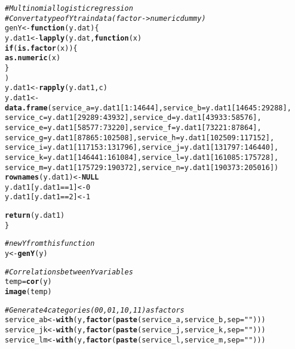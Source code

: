 \documentclass{article}\usepackage[]{graphicx}\usepackage[]{color}
\makeatletter
\newcommand{\hlnum}[1]{\textcolor[rgb]{0.686,0.059,0.569}{#1}}%
\newcommand{\hlstr}[1]{\textcolor[rgb]{0.192,0.494,0.8}{#1}}%
\newcommand{\hlcom}[1]{\textcolor[rgb]{0.678,0.584,0.686}{\textit{#1}}}%
\newcommand{\hlopt}[1]{\textcolor[rgb]{0,0,0}{#1}}%
\newcommand{\hlstd}[1]{\textcolor[rgb]{0.345,0.345,0.345}{#1}}%
\newcommand{\hlkwa}[1]{\textcolor[rgb]{0.161,0.373,0.58}{\textbf{#1}}}%
\newcommand{\hlkwb}[1]{\textcolor[rgb]{0.69,0.353,0.396}{#1}}%
\newcommand{\hlkwc}[1]{\textcolor[rgb]{0.333,0.667,0.333}{#1}}%
\newcommand{\hlkwd}[1]{\textcolor[rgb]{0.737,0.353,0.396}{\textbf{#1}}}%
\newenvironment{kframe}{%
 \def\at@end@of@kframe{}%
 \ifinner\ifhmode%
  \def\at@end@of@kframe{\end{minipage}}%
  \begin{minipage}{\columnwidth}%
 \fi\fi%
 \def\FrameCommand##1{\hskip\@totalleftmargin \hskip-\fboxsep
 \colorbox{shadecolor}{##1}\hskip-\fboxsep
     \hskip-\linewidth \hskip-\@totalleftmargin \hskip\columnwidth}%
 \MakeFramed {\advance\hsize-\width
   \@totalleftmargin\z@ \linewidth\hsize
   \@setminipage}}%
 {\par\unskip\endMakeFramed%
 \at@end@of@kframe}
\newenvironment{knitrout}{}{} %
\makeatother
\begin{document}
\begin{knitrout}
\begin{kframe}
\begin{alltt}
\hlcom{# Multinomial logistic regression}
\hlcom{# Convert a type of Y train data(factor -> numeric dummy)}
\hlstd{genY} \hlkwb{<-} \hlkwa{function}\hlstd{(}\hlkwc{y.dat}\hlstd{) \{}
  \hlstd{y.dat1} \hlkwb{<-} \hlkwd{lapply}\hlstd{(y.dat,} \hlkwa{function}\hlstd{(}\hlkwc{x}\hlstd{)}
    \hlkwa{if} \hlstd{(}\hlkwd{is.factor}\hlstd{(x)) \{}
      \hlkwd{as.numeric}\hlstd{(x)}
    \hlstd{\}}
  \hlstd{)}
  \hlstd{y.dat1} \hlkwb{<-} \hlkwd{rapply}\hlstd{(y.dat1, c)}
  \hlstd{y.dat1} \hlkwb{<-} \hlkwd{data.frame}\hlstd{(}\hlkwc{service_a}\hlstd{= y.dat1[}\hlnum{1}\hlopt{:}\hlnum{14644}\hlstd{],} \hlkwc{service_b}\hlstd{= y.dat1[}\hlnum{14645}\hlopt{:}\hlnum{29288}\hlstd{],}
                       \hlkwc{service_c}\hlstd{=y.dat1[}\hlnum{29289}\hlopt{:}\hlnum{43932}\hlstd{],} \hlkwc{service_d}\hlstd{=y.dat1[}\hlnum{43933}\hlopt{:}\hlnum{58576}\hlstd{],}
                       \hlkwc{service_e}\hlstd{=y.dat1[}\hlnum{58577}\hlopt{:}\hlnum{73220}\hlstd{],} \hlkwc{service_f}\hlstd{=y.dat1[}\hlnum{73221}\hlopt{:}\hlnum{87864}\hlstd{],}
                       \hlkwc{service_g}\hlstd{=y.dat1[}\hlnum{87865}\hlopt{:}\hlnum{102508}\hlstd{],} \hlkwc{service_h}\hlstd{=y.dat1[}\hlnum{102509}\hlopt{:}\hlnum{117152}\hlstd{],}
                       \hlkwc{service_i}\hlstd{=y.dat1[}\hlnum{117153}\hlopt{:}\hlnum{131796}\hlstd{],} \hlkwc{service_j}\hlstd{=y.dat1[}\hlnum{131797}\hlopt{:}\hlnum{146440}\hlstd{],}
                       \hlkwc{service_k}\hlstd{=y.dat1[}\hlnum{146441}\hlopt{:}\hlnum{161084}\hlstd{],} \hlkwc{service_l}\hlstd{=y.dat1[}\hlnum{161085}\hlopt{:}\hlnum{175728}\hlstd{],}
                       \hlkwc{service_m}\hlstd{=y.dat1[}\hlnum{175729}\hlopt{:}\hlnum{190372}\hlstd{],} \hlkwc{service_n}\hlstd{=y.dat1[}\hlnum{190373}\hlopt{:}\hlnum{205016}\hlstd{])}
  \hlkwd{rownames}\hlstd{(y.dat1)} \hlkwb{<-} \hlkwa{NULL}
  \hlstd{y.dat1[y.dat1} \hlopt{==} \hlnum{1}\hlstd{]} \hlkwb{<-} \hlnum{0}
  \hlstd{y.dat1[y.dat1} \hlopt{==} \hlnum{2}\hlstd{]} \hlkwb{<-} \hlnum{1}

  \hlkwd{return}\hlstd{(y.dat1)}
\hlstd{\}}

\hlcom{# new Y from this function}
\hlstd{y} \hlkwb{<-} \hlkwd{genY}\hlstd{(y)}

\hlcom{# Correlations between Y variables}
\hlstd{temp} \hlkwb{=} \hlkwd{cor}\hlstd{(y)}
\hlkwd{image}\hlstd{(temp)}

\hlcom{# Generate 4 categories(00, 01, 10, 11) as factors}
\hlstd{service_ab} \hlkwb{<-} \hlkwd{with}\hlstd{(y,} \hlkwd{factor}\hlstd{(}\hlkwd{paste}\hlstd{(service_a, service_b,} \hlkwc{sep}\hlstd{=}\hlstr{""}\hlstd{)))}
\hlstd{service_jk} \hlkwb{<-} \hlkwd{with}\hlstd{(y,} \hlkwd{factor}\hlstd{(}\hlkwd{paste}\hlstd{(service_j, service_k,} \hlkwc{sep}\hlstd{=}\hlstr{""}\hlstd{)))}
\hlstd{service_lm} \hlkwb{<-} \hlkwd{with}\hlstd{(y,} \hlkwd{factor}\hlstd{(}\hlkwd{paste}\hlstd{(service_l, service_m,} \hlkwc{sep}\hlstd{=}\hlstr{""}\hlstd{)))}


\end{alltt}
\end{kframe}
\end{knitrout}
\end{document}
